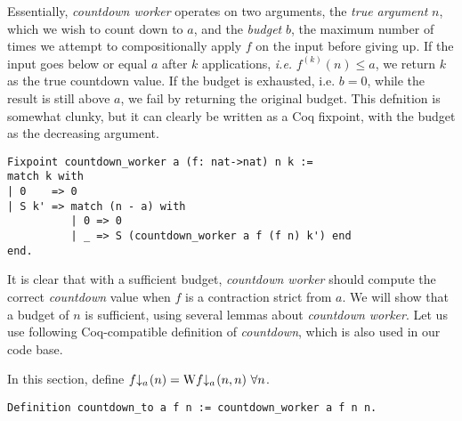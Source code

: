 Essentially, \emph{countdown worker} operates on two arguments, the \emph{true argument} $n$, which we wish to count down to $a$, and the \emph{budget} $b$,
the maximum number of times we attempt to compositionally 
apply $f$ on the input before giving up. If the input goes below or equal $a$ after $k$ applications, \emph{i.e.} $f^{(k)}(n) \le a$, we return $k$ as the true countdown value. If the budget is exhausted, i.e. $b = 0$, while the result is still above $a$, 
we fail by returning the original budget. This defnition is somewhat clunky, but it can clearly be written as a Coq fixpoint, with the budget as the decreasing
argument.
\begin{lstlisting}
Fixpoint countdown_worker a (f: nat->nat) n k :=
match k with
| 0    => 0
| S k' => match (n - a) with
          | 0 => 0
          | _ => S (countdown_worker a f (f n) k') end
end.
\end{lstlisting}
It is clear that with a sufficient budget, \emph{countdown worker} should compute the correct \emph{countdown} value when $f$ is a contraction strict from $a$. We will show that a budget of $n$ is sufficient, using several lemmas about \emph{countdown worker}. Let us use following Coq-compatible definition of \emph{countdown}, which is also used in our code base.
\begin{defn} \label{defn: countdown}
In this section, define  $\cdt{f}{a}(n) = \W\cdt{f}{a}(n, n) \ \forall n$.
\begin{lstlisting}
Definition countdown_to a f n := countdown_worker a f n n.
\end{lstlisting}
\end{defn}

